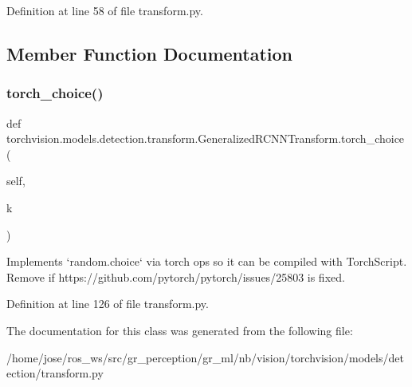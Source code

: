 Definition at line 58 of file transform.\+py.



\subsection{Member Function Documentation}
\mbox{\label{classtorchvision_1_1models_1_1detection_1_1transform_1_1GeneralizedRCNNTransform_abc8554160a0d2c71f41cb54f52487b10}} 
\subsubsection{\texorpdfstring{torch\+\_\+choice()}{torch\_choice()}}
{\footnotesize\ttfamily def torchvision.\+models.\+detection.\+transform.\+Generalized\+R\+C\+N\+N\+Transform.\+torch\+\_\+choice (\begin{DoxyParamCaption}\item[{}]{self,  }\item[{}]{k }\end{DoxyParamCaption})}

\begin{DoxyVerb}Implements `random.choice` via torch ops so it can be compiled with
TorchScript. Remove if https://github.com/pytorch/pytorch/issues/25803
is fixed.
\end{DoxyVerb}
 

Definition at line 126 of file transform.\+py.



The documentation for this class was generated from the following file\+:\begin{DoxyCompactItemize}
\item 
/home/jose/ros\+\_\+ws/src/gr\+\_\+perception/gr\+\_\+ml/nb/vision/torchvision/models/detection/transform.\+py\end{DoxyCompactItemize}
